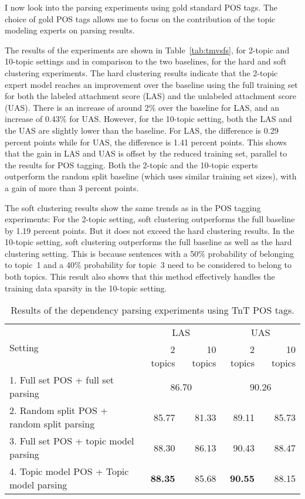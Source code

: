 I now look into the parsing experiments using gold standard POS tags. The choice of gold POS tags allows me to focus on the contribution of the topic modeling experts on parsing results. 


The results of the experiments are shown in Table~\ref{tab:tmvsfs}, for 2-topic and 10-topic settings and in comparison to the two baselines, for the hard and soft clustering experiments. The hard clustering results indicate that the 2-topic expert model reaches an improvement over the baseline using the full training set for both the labeled attachment score (LAS) and the unlabeled attachment score (UAS). There is an increase of around 2\% over the baseline for LAS, and an increase of 0.43\% for UAS. However, for the 10-topic setting, both the LAS and the UAS are slightly lower than the baseline. For LAS, the difference is 0.29 percent points while for UAS, the difference is 1.41 percent points. This shows that the gain in LAS and UAS is offset by the reduced training set, parallel to the results for POS tagging. Both the 2-topic and the 10-topic experts outperform the random split baseline (which uses similar training set sizes), with a gain of more than 3 percent points.

The soft clustering results show the same trends as in the POS tagging experiments:  For the 2-topic setting, soft clustering outperforms the full baseline by 1.19 percent points. But it does not exceed the hard clustering results.  In the 10-topic setting, soft clustering outperforms the full baseline as well as the hard clustering setting. This is because sentences with a 50\% probability of belonging to topic~1 and a 40\% probability for topic~3 need to be considered to belong to both topics. This result also shows that this method effectively handles the training data sparsity in the 10-topic setting.


\begin{table*}[t!]
	\centering
	\begin{tabular}{l|rr|rr}
		\multicolumn{1}{l|}{\multirow{2}{*}{Setting}} & \multicolumn{2}{c|}{LAS} & \multicolumn{2}{c}{UAS} \\
		\multicolumn{1}{c|}{} & 2 topics & 10 topics & 2 topics & 10 topics \\ \hline
		1. Full set POS + full set parsing & \multicolumn{2}{c|}{86.70} & \multicolumn{2}{c}{90.26} \\ 
		2. Random split POS + random split parsing & 85.77 & 81.33 & 89.11 & 85.73 \\ 
		3. Full set POS + topic model parsing & 88.30 & 86.13 & 90.43 & 88.47 \\ 
		4. Topic model POS + Topic model parsing & \textbf{88.35} & 85.68 & \textbf{90.55} & 88.15 \\ 
		\hline
	\end{tabular}
	\caption{Results of the dependency parsing experiments using TnT POS tags.}
	\label{tab:TnTPOS}
\end{table*}

